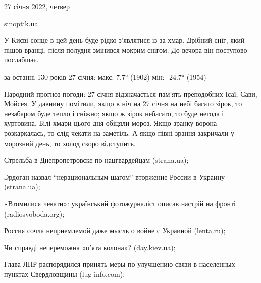  
 
 
 
 

27 січня 2022, четвер

sinoptik.ua

У Києві сонце в цей день буде рідко з'являтися із-за хмар. Дрібний сніг, який
пішов вранці, після полудня змінився мокрим снігом. До вечора він поступово
послабшає.

за останні 130 років 27 січня: макс: 7.7° (1902) мін: -24.7° (1954)

Народний прогноз погоди: 27 січня відзначається пам’ять преподобних Ісаї, Сави,
Мойсея. У давнину помітили, якщо в ніч на 27 січня на небі багато зірок, то
незабаром буде тепло і сніжно; якщо ж зірок небагато, то буде негода і
хуртовина. Білі хмари цього дня обіцяли мороз. Якщо зранку ворона розкаркалась,
то слід чекати на заметіль. А якщо півні зрання закричали у морозний день, то
холод скоро відступить.

Стрельба в Днепропетровске по нацгвардейцам (strana.ua); 

Эрдоган назвал \enquote{нерациональным шагом} вторжение России в Украину (strana.ua); 

«Втомилися чекати»: український фотожурналіст описав настрій на фронті (radiosvoboda.org); 

Россия сочла неприемлемой даже мысль о войне с Украиной (lenta.ru);

Чи справді непереможна «п'ята колона»? (day.kiev.ua);

Глава ЛНР распорядился принять меры по улучшению связи в населенных пунктах Свердловщины (lug-info.com);


